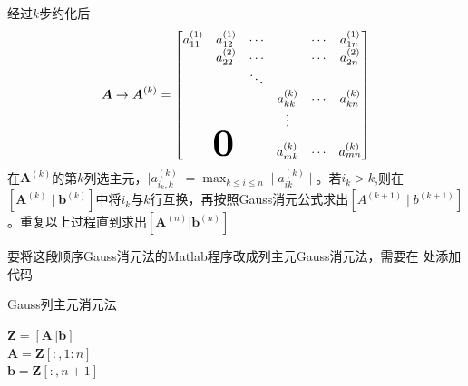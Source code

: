 \begin{definition}[列主元Gauss消元法]
    经过$k$步约化后
    \[
        \boldsymbol{A}\to \boldsymbol{A}^{(k)}=
        \begin{bmatrix}
            a_{11}^{(1)} & a_{12}^{(1)} & \cdots & & \cdots & a_{1n}^{(1)}\\
            & a_{22}^{(2)} & \cdots & & \cdots & a_{2n}^{(2)}\\
            & & \ddots & & & \\
            & & & a_{kk}^{(k)} & \cdots & a_{kn}^{(k)}\\
            & & & \vdots & & \\
            \multicolumn{3}{c}{\resizebox{4ex}{!}{$\boldsymbol{0}$}} & a_{mk}^{(k)} & \cdots & a_{mn}^{(k)}
        \end{bmatrix}
    \]
    在$\boldsymbol{A}^{(k)}$的第$k$列选主元，$\mid a_{i_k,k}^{(k)}\mid=\max_{k\leq i\leq n}\mid a_{ik}^{(k)}\mid$。若$i_k>k$,则在$[\boldsymbol{A}^{(k)}\mid \boldsymbol{b}^{(k)}]$中将$i_k$与$k$行互换，再按照Gauss消元公式求出$[A^{(k+1)}\mid b^{(k+1)}]$。重复以上过程直到求出$[\boldsymbol{A}^{(n)}|\boldsymbol{b}^{(n)}]$
\end{definition}
\begin{example}
    要将这段顺序Gauss消元法的Matlab程序改成列主元Gauss消元法，需要在 处添加代码
    
    \begin{algorithm}[H]
        \SetAlgoLined
        \caption{Gauss列主元消元法}
        \label{alg:GaussElim}
        $\boldsymbol{Z} = [\boldsymbol{A}\,| \boldsymbol{b}]$\\
        $\boldsymbol{A} = \boldsymbol{Z}[:,1:n]$\\
        $\boldsymbol{b} = \boldsymbol{Z}[:,n+1]$\\
    \end{algorithm}
\end{example}
